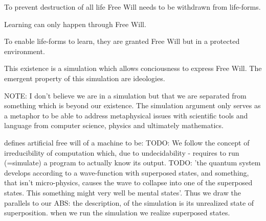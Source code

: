 \documentclass[twocolumn]{article}
\begin{document}
\begin{theorem}
To prevent destruction of all life Free Will needs to be withdrawn from life-forms.
\end{theorem}

\begin{theorem}
Learning can only happen through Free Will.
\end{theorem}

\begin{theorem}
To enable life-forms to learn, they are granted Free Will but in a protected environment.
\end{theorem}

\begin{corollary}
This existence is a simulation which allows conciousness to express Free Will. The emergent property of this simulation are ideologies.
\end{corollary}

NOTE:  I don't believe we are in a simulation but that we are separated from something which is beyond our existence. The simulation argument only serves as a metaphor to be able to address metaphysical issues with scientific tools and language from computer science, physics and ultimately mathematics.

\cite{irtem_simulation_1978} defines artificial free will of a machine to be:
TODO: We follow the concept of irreducibility of computation which, due to undecidability - requires to run (=simulate) a program to actually know its output.
TODO: 'the quantum system develops according to a wave-function with superposed states, and something, that isn't micro-physics, causes the wave to collapse into one of the superposed states. This something might very well be mental states'. Thus we draw the parallels to our ABS: the description, of the simulation is its unrealized state of superposition. when we run the simulation we realize superposed states. 
\end{document}
